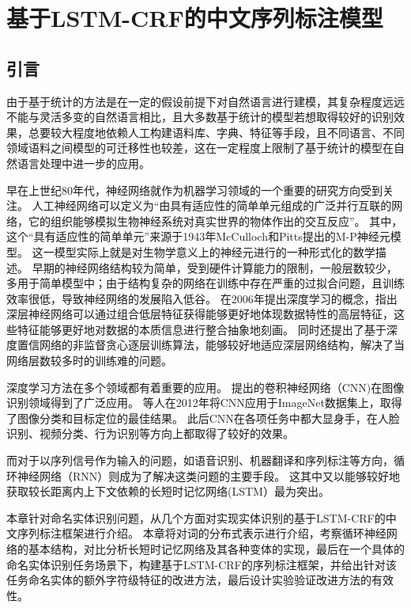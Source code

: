 \chapter{基于LSTM-CRF的中文序列标注模型}
\label{chap:3}
\section{引言}
由于基于统计的方法是在一定的假设前提下对自然语言进行建模，其复杂程度远远不能与灵活多变的自然语言相比，且大多数基于统计的模型若想取得较好的识别效果，总要较大程度地依赖人工构建语料库、字典、特征等手段，且不同语言、不同领域语料之间模型的可迁移性也较差，这在一定程度上限制了基于统计的模型在自然语言处理中进一步的应用。

早在上世纪80年代，神经网络就作为机器学习领域的一个重要的研究方向受到关注。
人工神经网络可以定义为“由具有适应性的简单单元组成的广泛并行互联的网络，它的组织能够模拟生物神经系统对真实世界的物体作出的交互反应”。
其中，这个“具有适应性的简单单元”来源于1943年McCulloch和Pitts提出的M-P神经元模型。
这一模型实际上就是对生物学意义上的神经元进行的一种形式化的数学描述。
早期的神经网络结构较为简单，受到硬件计算能力的限制，一般层数较少，多用于简单模型中；由于结构复杂的网络在训练中存在严重的过拟合问题，且训练效率很低，导致神经网络的发展陷入低谷。
\citet{hinton2009deep}在2006年提出深度学习的概念，指出深层神经网络可以通过组合低层特征获得能够更好地体现数据特性的高层特征，这些特征能够更好地对数据的本质信息进行整合抽象地刻画。
同时还提出了基于深度置信网络的非监督贪心逐层训练算法，能够较好地适应深层网络结构，解决了当网络层数较多时的训练难的问题。

深度学习方法在多个领域都有着重要的应用。
\citet{lecun1998gradient}提出的卷积神经网络（CNN)在图像识别领域得到了广泛应用。
\citet{krizhevsky2012imagenet}等人在2012年将CNN应用于ImageNet数据集上，取得了图像分类和目标定位的最佳结果。
此后CNN在各项任务中都大显身手，在人脸识别、视频分类、行为识别等方向上都取得了较好的效果。

而对于以序列信号作为输入的问题，如语音识别、机器翻译和序列标注等方向，循环神经网络（RNN）则成为了解决这类问题的主要手段。
这其中又以能够较好地获取较长距离内上下文依赖的长短时记忆网络(LSTM）最为突出。

本章针对命名实体识别问题，从几个方面对实现实体识别的基于LSTM-CRF的中文序列标注框架进行介绍。
本章将对词的分布式表示进行介绍，考察循环神经网络的基本结构，对比分析长短时记忆网络及其各种变体的实现，最后在一个具体的命名实体识别任务场景下，构建基于LSTM-CRF的序列标注框架，并给出针对该任务命名实体的额外字符级特征的改进方法，最后设计实验验证改进方法的有效性。

